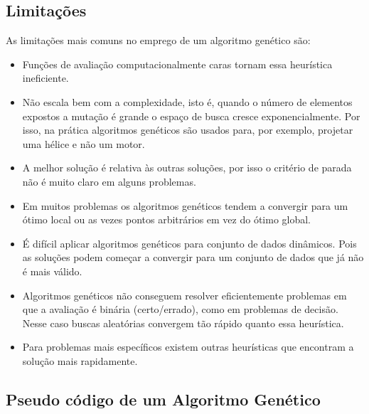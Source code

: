 \subsection{Limitações}

As limitações mais comuns no emprego de um algoritmo genético são:

\begin{itemize}
\item
  Funções de avaliação computacionalmente caras tornam essa heurística
  ineficiente.
\item
  Não escala bem com a complexidade, isto é, quando o número de
  elementos expostos a mutação é grande o espaço de busca cresce
  exponencialmente. Por isso, na prática algoritmos genéticos são
  usados para, por exemplo, projetar uma hélice e não um motor.
\item
  A melhor solução é relativa às outras soluções, por isso o critério de
  parada não é muito claro em alguns problemas.
\item
  Em muitos problemas os algoritmos genéticos tendem a convergir para
  um ótimo local ou as vezes pontos arbitrários em vez do ótimo global.
\item
  É difícil aplicar algoritmos genéticos para conjunto de dados
  dinâmicos. Pois as soluções podem começar a convergir para um conjunto
  de dados que já não é mais válido.
\item
  Algoritmos genéticos não conseguem resolver eficientemente problemas
  em que a avaliação é binária (certo/errado), como em problemas de
  decisão. Nesse caso buscas aleatórias convergem tão rápido quanto essa
  heurística.
\item
  Para problemas mais específicos existem outras heurísticas que
  encontram a solução mais rapidamente.
\end{itemize}

\subsection{Pseudo código de um Algoritmo Genético}

